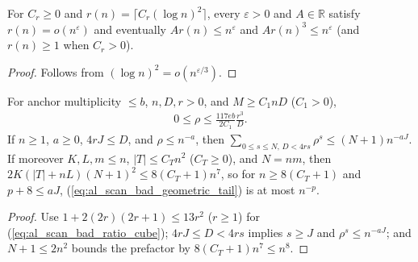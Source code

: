 \begin{lemma}
    \label{lem:al_scan_rounded_radius}
    \leanok
    For $C_r\ge0$ and $r(n)=\lceil C_r(\log n)^2\rceil$, every $\varepsilon>0$ and $A\in\mathbb R$ satisfy $r(n)=o(n^\varepsilon)$ and eventually
    $Ar(n)\le n^\varepsilon$ and $Ar(n)^3\le n^\varepsilon$ (and $r(n)\ge1$ when $C_r>0$).
\end{lemma}
\begin{proof}\leanok
    Follows from $(\log n)^2=o(n^{\varepsilon/3})$.
\end{proof}

\begin{lemma}
    \label{lem:al_scan_fixed_ancestry_cutoff}
    \leanok
    For anchor multiplicity $\le b$, $n,D,r>0$, and $M\ge C_1nD$ ($C_1>0$),
    \begin{align}
        0\le\rho\le \frac{117e b}{2C_1}\frac{r^3}{D}.
        \label{eq:al_scan_bad_ratio_cube}
    \end{align}
    If $n\ge1$, $a\ge0$, $4rJ\le D$, and $\rho\le n^{-a}$, then
    $\sum_{0\le s\le N,\,D<4rs}\rho^s\le (N+1)n^{-aJ}$.
    If moreover $K,L,m\le n$, $|T|\le C_Tn^2$ ($C_T\ge0$), and $N=nm$, then
    $2K(|T|+nL)(N+1)^2\le8(C_T+1)n^7$, so for $n\ge8(C_T+1)$ and $p+8\le aJ$, (\ref{eq:al_scan_bad_geometric_tail}) is at most $n^{-p}$.
\end{lemma}
\begin{proof}\leanok
    Use $1+2(2r)(2r+1)\le 13r^2$ ($r\ge1$) for (\ref{eq:al_scan_bad_ratio_cube}); $4rJ\le D<4rs$ implies $s\ge J$ and $\rho^s\le n^{-aJ}$; and $N+1\le 2n^2$ bounds the prefactor by $8(C_T+1)n^7\le n^8$.
\end{proof}

